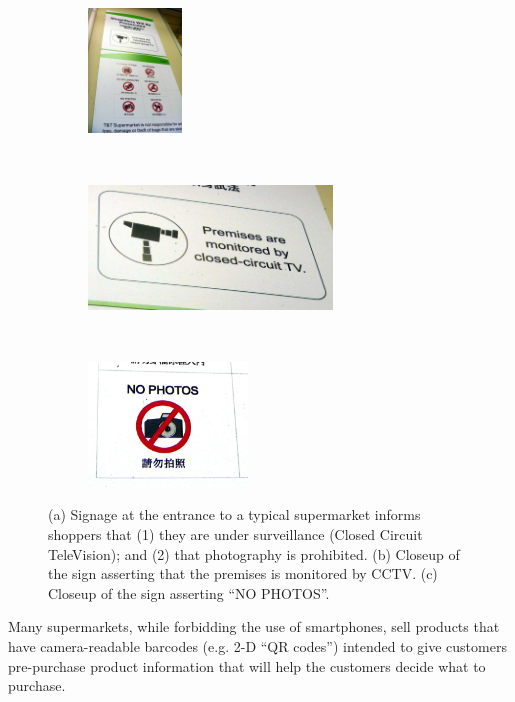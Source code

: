 \begin{figure} [t]
\begin{subfigure}[t]{1.5in}
   \centering
    \includegraphics[height=1.3in]{ch6/figs/signo_tnt_und2.jpg}
    \caption{}
    \label{subfig:signotntwide}
\end{subfigure}
~
\begin{subfigure}[t]{3.0in}
   \centering
   \includegraphics[height=1.3in]{ch6/figs/signo_tnt_cctv.jpg}
    \caption{}
    \label{subfig:signotntcctv}
\end{subfigure}
~
\begin{subfigure}[t]{1.5in}
   \centering
    \includegraphics[height=1.3in]{ch6/figs/signo_tnt_no_photos.jpg}
    \caption{}
    \label{subfig:signotntnophotos}
\end{subfigure}

  \caption{(a) Signage at the entrance to a typical supermarket informs
               shoppers that (1) they are under surveillance (Closed Circuit
               TeleVision); and (2) that photography is prohibited.
           (b) Closeup of the sign asserting that the premises is monitored by
               CCTV.
           (c) Closeup of the sign asserting ``NO PHOTOS''.
  }
  \label{fig:signo}
\end{figure}

Many supermarkets, while forbidding the use of smartphones,
sell products that have camera-readable barcodes (e.g. 2-D ``QR codes'') intended to give customers pre-purchase product information that will help the customers decide what to purchase.

